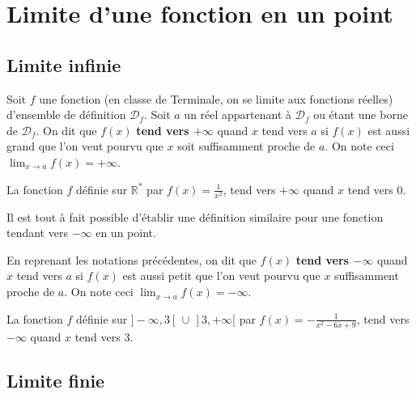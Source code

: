 


	
	\section{Limite d'une fonction en un point}
	
	\subsection{Limite infinie}
	
	\begin{formula}
		Soit $f$ une fonction (en classe de Terminale, on se limite aux fonctions réelles) d'ensemble de définition $\mathcal{D}_f$. Soit $a$ un réel appartenant à $\mathcal{D}_f$ ou étant une borne de $\mathcal{D}_f$.
		\newpar
		On dit que $f(x)$ \textbf{tend vers $+\infty$} quand $x$ tend vers $a$ si $f(x)$ est aussi grand que l'on veut pourvu que $x$ soit suffisamment proche de $a$.
		\newpar
		On note ceci $\lim_{x \rightarrow a} f(x) = +\infty$.
	\end{formula}
	
	\begin{tip}[Exemple]
		La fonction $f$ définie sur $\mathbb{R}^*$ par $f(x) = \frac{1}{x^2}$, tend vers $+\infty$ quand $x$ tend vers $0$.
	\end{tip}
	
	Il est tout à fait possible d'établir une définition similaire pour une fonction tendant vers $-\infty$ en un point.
	
	\begin{tip}
		En reprenant les notations précédentes, on dit que $f(x)$ \textbf{tend vers $-\infty$} quand $x$ tend vers $a$ si $f(x)$ est aussi petit que l'on veut pourvu que $x$ suffisamment proche de $a$.
		\newpar
		On note ceci $\lim_{x \rightarrow a} f(x) = -\infty$.
	\end{tip}
	
	\begin{tip}[Exemple]
		La fonction $f$ définie sur $]-\infty, 3[ \, \cup \, ]3, +\infty[$ par $f(x) = -\frac{1}{x^2-6x+9}$, tend vers $-\infty$ quand $x$ tend vers $3$.
	\end{tip}
	
	\subsection{Limite finie}
	
